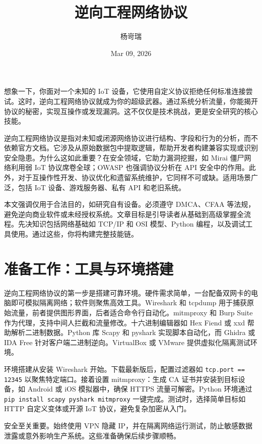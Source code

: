 \title{逆向工程网络协议}
\author{杨岢瑞}
\date{Mar 09, 2026}
\maketitle
想象一下，你面对一个未知的 IoT 设备，它使用自定义协议拒绝任何标准连接尝试。这时，逆向工程网络协议就成为你的超级武器。通过系统分析流量，你能揭开协议的秘密，实现互操作或发现漏洞。这不仅仅是技术挑战，更是安全研究的核心技能。\par
逆向工程网络协议是指对未知或闭源网络协议进行结构、字段和行为的分析，而不依赖官方文档。它涉及从原始数据包中提取逻辑，帮助开发者构建兼容实现或识别安全隐患。为什么这如此重要？在安全领域，它助力漏洞挖掘，如 Mirai 僵尸网络利用弱 IoT 协议席卷全球；OWASP 也强调协议分析在 API 安全中的作用。此外，对于互操作性开发、协议优化和遗留系统维护，它同样不可或缺。适用场景广泛，包括 IoT 设备、游戏服务器、私有 API 和老旧系统。\par
本文强调仅用于合法目的，如研究自有设备。必须遵守 DMCA、CFAA 等法规，避免逆向商业软件或未经授权系统。文章目标是引导读者从基础到高级掌握全流程。先决知识包括网络基础如 TCP/IP 和 OSI 模型、Python 编程，以及调试工具使用。通过这些，你将构建完整技能链。\par
\chapter{准备工作：工具与环境搭建}
逆向工程网络协议的第一步是搭建可靠环境。硬件需求简单，一台配备双网卡的电脑即可模拟隔离网络；软件则聚焦高效工具。Wireshark 和 tcpdump 用于捕获原始流量，前者提供图形界面，后者适合命令行自动化。mitmproxy 和 Burp Suite 作为代理，支持中间人拦截和流量修改。十六进制编辑器如 Hex Fiend 或 xxd 帮助解析二进制数据。Python 库 Scapy 和 pyshark 实现脚本自动化，而 Ghidra 或 IDA Free 针对客户端二进制逆向。VirtualBox 或 VMware 提供虚拟化隔离测试环境。\par
环境搭建从安装 Wireshark 开始。下载最新版后，配置过滤器如 \texttt{tcp.port == 12345} 以聚焦特定端口。接着设置 mitmproxy：生成 CA 证书并安装到目标设备，如 Android 或 iOS 模拟器中，确保 HTTPS 流量可解密。Python 环境通过 \texttt{pip install scapy pyshark mitmproxy} 一键完成。测试时，选择简单目标如 HTTP 自定义变体或开源 IoT 协议，避免复杂加密从入门。\par
安全至关重要。始终使用 VPN 隐藏 IP，并在隔离网络运行测试，防止敏感数据泄露或意外影响生产系统。这些准备确保后续步骤顺畅。\par
